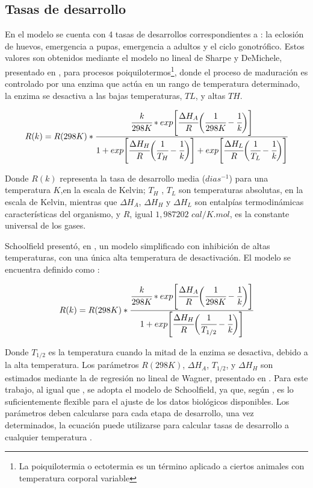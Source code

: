 \subsection{Tasas de desarrollo}
\label{subsec:cap4-tasas de desarrollo}
En el modelo se cuenta con 4 tasas de desarrollos correspondientes a : la eclosión de huevos,
emergencia a pupas, emergencia a adultos y el ciclo gonotrófico. Estos valores son obtenidos
mediante el modelo no lineal de Sharpe y DeMichele, presentado en \cite{sharpe1977reaction}, para procesos poiquilotermos\footnote{ La poiquilotermia o ectotermia es un término aplicado a ciertos
animales con temperatura corporal variable}, donde el proceso de maduración es controlado por
una enzima que actúa en un rango de temperatura determinado, la enzima se desactiva a las bajas temperaturas, $TL$, y altas $TH$.

\begin{equation} \label{eq:sharpe-demichele}
   R(k)  = R(298K) *\cfrac{ \cfrac{k}{298K} *
    exp \Bigg[
            \cfrac{\Delta H_{A}}{R} \bigg(\cfrac{1}{298K} - \cfrac{1}{k}\bigg)
        \Bigg]}
    {1 + exp\Bigg[\cfrac{\Delta H_{H}}{R} \bigg(\cfrac{1}{T_{H}}- \cfrac{1}{k}\bigg)\Bigg] +  exp\Bigg[\cfrac{\Delta H_{L}}{R} \bigg(\cfrac{1}{T_{L}}- \cfrac{1}{k}\bigg)\Bigg]}
\end{equation}

Donde $R(k)$ representa la tasa de desarrollo media ($dias^{-1}$) para una temperatura $K$,en la
escala de Kelvin; $T_{H}$ , $T_{L}$ son temperaturas absolutas, en la escala de Kelvin, mientras
que $\Delta H_{A}$, $\Delta H_{H}$ y $\Delta H_{L}$ son entalpías termodinámicas características
del organismo, y $R$, igual $1,987202$ $cal/K.mol$, es la constante universal de los gases.

Schoolfield presentó, en \cite{schoolfield1981non}, un modelo simplificado con inhibición de altas
temperaturas, con una única alta temperatura de desactivación. El modelo se encuentra definido
como :

\begin{equation} \label{eq:schoolfield}
   R(k)  = R(298K) *\cfrac{ \cfrac{k}{298K} *
    exp \Bigg[
            \cfrac{\Delta H_{A}}{R} \bigg(\cfrac{1}{298K} - \cfrac{1}{k}\bigg)
        \Bigg]}
    {1 + exp\Bigg[\cfrac{\Delta H_{H}}{R} \bigg(\cfrac{1}{T_{1/2}}- \cfrac{1}{k}\bigg)\Bigg] }
\end{equation}

Donde $T_{1/2}$ es la temperatura cuando la mitad de la enzima se desactiva, debido a la alta
temperatura. Los parámetros $R(298K)$, $\Delta H_{A}$, $T_{1/2}$, y $\Delta H_{H}$ son estimados
mediante la de regresión no lineal de Wagner, presentado en \cite{wagner1984modeling}. Para este
trabajo, al igual que \cite{rueda1990temperature, otero2006stochastic}, se adopta el modelo de
Schoolfield, ya que, según \cite{otero2006stochastic}, es lo suficientemente flexible para el
ajuste de los datos biológicos disponibles. Los parámetros deben calcularse para cada etapa de
desarrollo, una vez determinados, la ecuación puede utilizarse para calcular tasas de desarrollo a
cualquier temperatura \cite{rueda1990temperature}.
